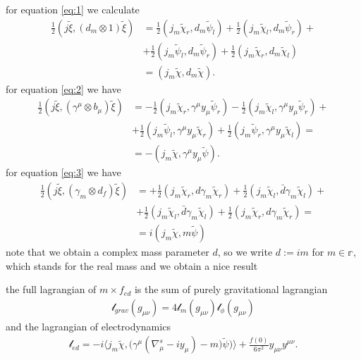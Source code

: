 for equation \ref{eq:1} we calculate
\begin{align}
    \frac{1}{2}(j\tilde{\xi}, (d_m\otimes 1)\tilde{\xi}) &=
    \frac{1}{2}(j_m\tilde{\chi}_r,d_m\tilde{\psi}_l)+
    \frac{1}{2}(j_m\tilde{\chi}_l,d_m\tilde{\psi}_r)+
    \\&+\frac{1}{2}(j_m\tilde{\psi}_l,d_m\tilde{\psi}_r)+
    \frac{1}{2}(j_m\tilde{\chi}_r,d_m\tilde{\chi}_l)\\
    &= (j_m\tilde{\chi},d_m\tilde{\chi}).
\end{align}
for equation \ref{eq:2} we have
\begin{align}
    \frac{1}{2}(j\tilde{\xi}, (\gamma^\mu \otimes b_\mu)\tilde{\xi})&=
    -\frac{1}{2}(j_m\tilde{\chi}_r, \gamma^\mu y_\mu\tilde{\psi}_r)
    -\frac{1}{2}(j_m\tilde{\chi}_l, \gamma^\mu y_\mu\tilde{\psi}_r)+\\
    &+\frac{1}{2}(j_m\tilde{\psi}_l, \gamma^\mu y_\mu\tilde{\chi}_r)+
    \frac{1}{2}(j_m\tilde{\psi}_r, \gamma^\mu y_\mu\tilde{\chi}_l)=\\
    &= -(j_m\tilde{\chi}, \gamma^\mu y_\mu\tilde{\psi}).
\end{align}
for equation \ref{eq:3} we have
\begin{align}
    \frac{1}{2}(j\tilde{\xi}, (\gamma_m\otimes d_f)\tilde{\xi})&=
    +\frac{1}{2}(j_m\tilde{\chi}_r, d\gamma_m\tilde{\chi}_r)
    +\frac{1}{2}(j_m\tilde{\chi}_l, \bar{d}\gamma_m\tilde{\chi}_l)+\\
    &+\frac{1}{2}(j_m\tilde{\chi}_l, \bar{d}\gamma_m\tilde{\chi}_l)
    +\frac{1}{2}(j_m\tilde{\chi}_r, d\gamma_m\tilde{\chi}_r)=\\
    &= i(j_m\tilde{\chi}, m\tilde{\psi})
\end{align}
note that we obtain a complex mass parameter $d$, so we write $d:=im$ for $m\in \mathbb{r}$,
which stands for the real mass and we obtain a nice result

\begin{theorem}
    the full lagrangian of $m\times f_{ed}$ is the sum of purely gravitational
    lagrangian
    \begin{align}
        \mathcal{l}_{grav}(g_{\mu\nu})=4\mathcal{l}_m(g_{\mu\nu})
        \mathcal{l}_\phi (g_{\mu\nu})
    \end{align}
    and the lagrangian of electrodynamics
    \begin{align}
        \mathcal{l}_{ed} = -i\bigg\langle
        j_m\tilde{\chi},\big(\gamma^\mu(\nabla^s_\mu - iy_\mu) -m\big)\tilde{\psi})
        \bigg\rangle
        +\frac{f(0)}{6\pi^2} y_{\mu\nu}y^{\mu\nu}.
    \end{align}

\end{theorem}
